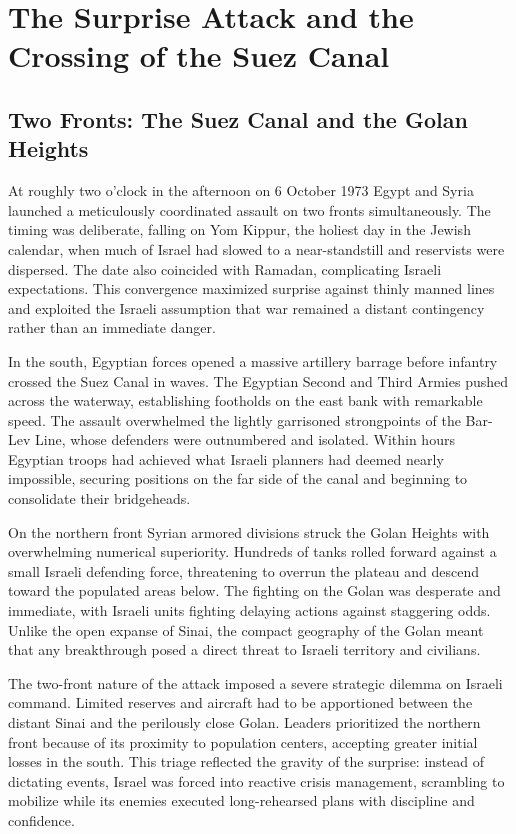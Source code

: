 \section{The Surprise Attack and the Crossing of the Suez Canal}

\subsection{Two Fronts: The Suez Canal and the Golan Heights}
At roughly two o'clock in the afternoon on 6 October 1973 Egypt and Syria launched a meticulously coordinated assault on two fronts simultaneously. The timing was deliberate, falling on Yom Kippur, the holiest day in the Jewish calendar, when much of Israel had slowed to a near-standstill and reservists were dispersed. The date also coincided with Ramadan, complicating Israeli expectations. This convergence maximized surprise against thinly manned lines and exploited the Israeli assumption that war remained a distant contingency rather than an immediate danger.

In the south, Egyptian forces opened a massive artillery barrage before infantry crossed the Suez Canal in waves. The Egyptian Second and Third Armies pushed across the waterway, establishing footholds on the east bank with remarkable speed. The assault overwhelmed the lightly garrisoned strongpoints of the Bar-Lev Line, whose defenders were outnumbered and isolated. Within hours Egyptian troops had achieved what Israeli planners had deemed nearly impossible, securing positions on the far side of the canal and beginning to consolidate their bridgeheads.

On the northern front Syrian armored divisions struck the Golan Heights with overwhelming numerical superiority. Hundreds of tanks rolled forward against a small Israeli defending force, threatening to overrun the plateau and descend toward the populated areas below. The fighting on the Golan was desperate and immediate, with Israeli units fighting delaying actions against staggering odds. Unlike the open expanse of Sinai, the compact geography of the Golan meant that any breakthrough posed a direct threat to Israeli territory and civilians.

The two-front nature of the attack imposed a severe strategic dilemma on Israeli command. Limited reserves and aircraft had to be apportioned between the distant Sinai and the perilously close Golan. Leaders prioritized the northern front because of its proximity to population centers, accepting greater initial losses in the south. This triage reflected the gravity of the surprise: instead of dictating events, Israel was forced into reactive crisis management, scrambling to mobilize while its enemies executed long-rehearsed plans with discipline and confidence.

